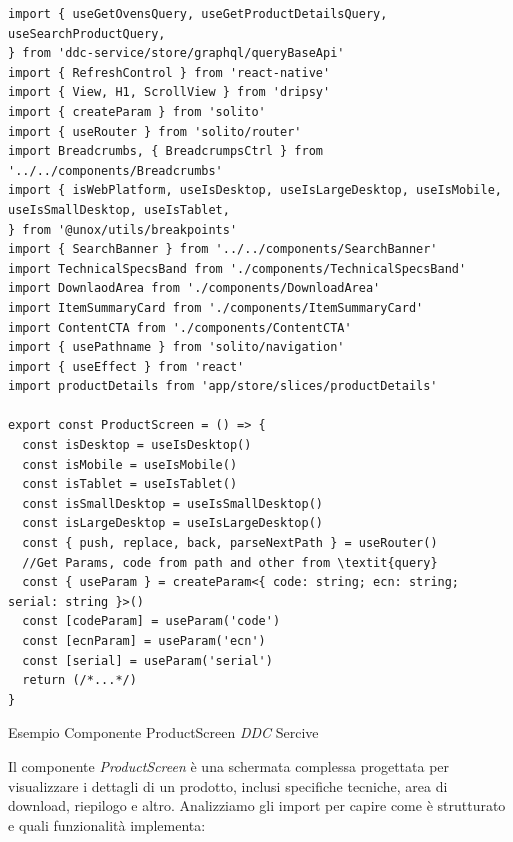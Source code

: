 \begin{listing}[H]
    \begin{verbatim} 
import { useGetOvensQuery, useGetProductDetailsQuery, useSearchProductQuery,
} from 'ddc-service/store/graphql/queryBaseApi'
import { RefreshControl } from 'react-native'
import { View, H1, ScrollView } from 'dripsy'
import { createParam } from 'solito'
import { useRouter } from 'solito/router'
import Breadcrumbs, { BreadcrumpsCtrl } from '../../components/Breadcrumbs'
import { isWebPlatform, useIsDesktop, useIsLargeDesktop, useIsMobile, useIsSmallDesktop, useIsTablet,
} from '@unox/utils/breakpoints'
import { SearchBanner } from '../../components/SearchBanner'
import TechnicalSpecsBand from './components/TechnicalSpecsBand'
import DownlaodArea from './components/DownloadArea'
import ItemSummaryCard from './components/ItemSummaryCard'
import ContentCTA from './components/ContentCTA'
import { usePathname } from 'solito/navigation'
import { useEffect } from 'react'
import productDetails from 'app/store/slices/productDetails'

export const ProductScreen = () => {
  const isDesktop = useIsDesktop()
  const isMobile = useIsMobile()
  const isTablet = useIsTablet()
  const isSmallDesktop = useIsSmallDesktop()
  const isLargeDesktop = useIsLargeDesktop()
  const { push, replace, back, parseNextPath } = useRouter()
  //Get Params, code from path and other from \textit{query}
  const { useParam } = createParam<{ code: string; ecn: string; serial: string }>()
  const [codeParam] = useParam('code')
  const [ecnParam] = useParam('ecn')
  const [serial] = useParam('serial')
  return (/*...*/)
}
    \end{verbatim}
    \caption{Esempio Componente ProductScreen \textit{DDC} Sercive}
    \label{listing_productscreen_ddcservice}
\end{listing}

Il componente \textit{ProductScreen} è una schermata complessa progettata per visualizzare i dettagli di un prodotto, 
inclusi specifiche tecniche, area di download, riepilogo e altro.
Analizziamo gli import per capire come è strutturato e quali funzionalità implementa:

